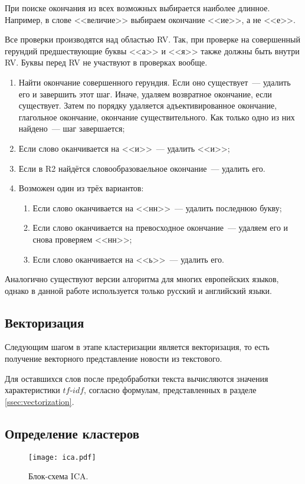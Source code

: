 При поиске окончания из всех возможных выбирается наиболее длинное. Например, в слове <<величие>> выбираем окончание <<ие>>, а не <<е>>.

Все проверки производятся над областью RV. Так, при проверке на совершенный герундий предшествующие буквы <<а>> и <<я>> также должны быть внутри RV. Буквы перед RV не участвуют в проверках вообще.

\begin{enumerate}
    \item Найти окончание совершенного герундия. Если оно существует~--- удалить его и завершить этот шаг. Иначе, удаляем возвратное окончание, если существует. Затем по порядку удаляется адъективированное окончание, глагольное окончание, окончание существительного. Как только одно из них найдено~--- шаг завершается;
    \item Если слово оканчивается на <<и>>~--- удалить <<и>>;
    \item Если в R2 найдётся словообразоваельное окончание~--- удалить его.
    \item Возможен один из трёх вариантов:
        \begin{enumerate}
            \item Если слово оканчивается на <<нн>>~--- удалить последнюю букву;
            \item Если слово оканчивается на превосходное окончание~--- удаляем его и снова проверяем <<нн>>;
            \item Если слово оканчивается на <<ь>>~--- удалить его.
        \end{enumerate}
\end{enumerate}

Аналогично существуют версии алгоритма для многих европейских языков, однако в данной работе используется только русский и английский языки.

\subsection{Векторизация}
Следующим шагом в этапе кластеризации является векторизация, то есть получение векторного представление новости из текстового.

Для оставшихся слов после предобработки текста вычисляются значения характеристики $tf\text{-}idf$, согласно формулам, представленных в разделе \ref{ssec:vectorization}.

\subsection{Определение кластеров} \label{ssec:clustering}
\begin{figure}[h]
    \centering
    \texttt{[image: ica.pdf]}
    \caption{Блок-схема ICA.}
    \label{fig:ica}
\end{figure}

